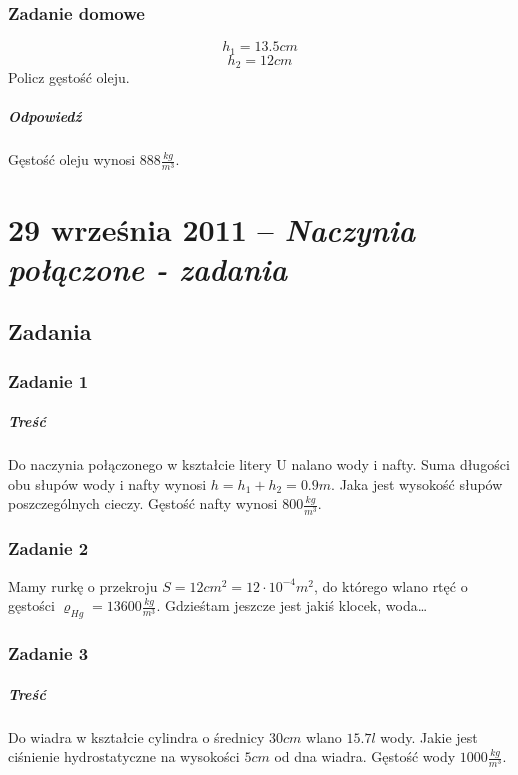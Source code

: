 \documentclass [a4paper, 11pt, oneside]{book}
\begin{document}
		\subsection{Zadanie domowe} %
		\label{sub:zadanie_domowe}
			\[
				h_1 = 13.5cm
			\]
			\[
				h_2 = 12cm
			\]
			Policz gęstość oleju.
			\paragraph{Odpowiedź} Gęstość oleju wynosi $888\frac{kg}{m^3}$.

\chapter{29 września 2011 -- \textit{Naczynia połączone - zadania}} %
\label{cha:29_wrze_nia_2011_textit}
	\section{Zadania} %
	\label{sec:zadania}
	\subsection{Zadanie 1} %
	\label{sub:zadanie_1}
		\paragraph{Treść}Do naczynia połączonego w kształcie litery U nalano wody i nafty. Suma długości obu słupów wody i nafty wynosi $h = h_1+h_2 = 0.9m$. Jaka jest wysokość słupów poszczególnych cieczy. Gęstość nafty wynosi $800\frac{kg}{m^3}$.
	\subsection{Zadanie 2} %
	\label{sub:zadanie_2}
		Mamy rurkę o przekroju $S = 12cm^2 = 12\cdot10^{-4}m^2$, do którego wlano rtęć o gęstości $\varrho_{Hg} = 13600\frac{kg}{m^3}$. Gdzieśtam jeszcze jest jakiś klocek, woda\dots
	\subsection{Zadanie 3} %
	\label{sub:zadanie_3}
		\paragraph{Treść} Do wiadra w kształcie cylindra o średnicy $30cm$ wlano $15.7l$ wody. Jakie jest ciśnienie hydrostatyczne na wysokości $5cm$ od dna wiadra. Gęstość wody $1000\frac{kg}{m^3}$.
\end{document}
